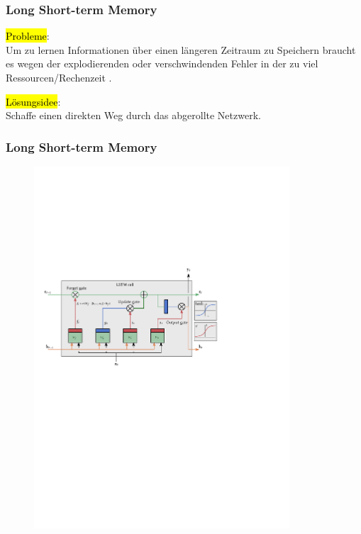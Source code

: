 \documentclass[german,aspectratio=169]{beamer}
\begin{document}
\begin{frame}
	\frametitle{Long Short-term Memory}
	
	\hl{Probleme}:\\
		Um zu lernen Informationen über einen längeren Zeitraum zu Speichern braucht es wegen der explodierenden oder verschwindenden Fehler in der  zu viel Ressourcen/Rechenzeit \cite{Hochreiter1997}.\\\vspace{1cm}

	\hl{Lösungsidee}:\\
	Schaffe einen direkten Weg durch das abgerollte Netzwerk.
	
\end{frame}

\begin{frame}
	\frametitle{Long Short-term Memory}
	
	\begin{figure}
		\includegraphics[width=0.85\textwidth]{lstm-cell}
	\end{figure}
	
\end{frame}
\end{document}
